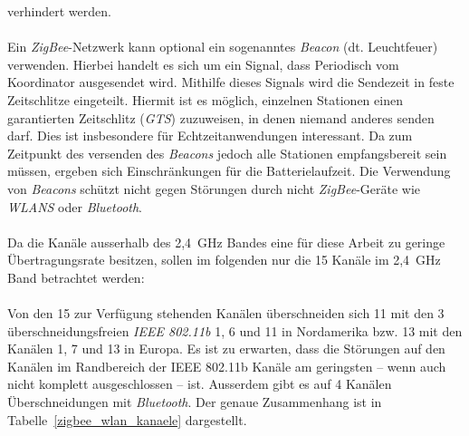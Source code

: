                 verhindert werden.\\
                \\
                Ein \emph{ZigBee}-Netzwerk kann optional ein sogenanntes \emph{Beacon} (dt. Leuchtfeuer) verwenden. Hierbei
                handelt es sich um ein Signal, dass Periodisch vom Koordinator ausgesendet wird. Mithilfe
                dieses Signals wird die Sendezeit in feste Zeitschlitze eingeteilt. Hiermit ist es möglich, 
                einzelnen Stationen einen garantierten Zeitschlitz (\emph{GTS}) zuzuweisen, in denen niemand anderes
                senden darf. Dies ist insbesondere für Echtzeitanwendungen interessant. Da zum Zeitpunkt des
                versenden des \emph{Beacons} jedoch alle Stationen empfangsbereit sein müssen, ergeben sich 
                Einschränkungen für die Batterielaufzeit. Die Verwendung von \emph{Beacons} schützt nicht gegen
                Störungen durch nicht \emph{ZigBee}-Geräte wie \emph{WLANS} oder \emph{Bluetooth}.\\
                \\
                Da die Kanäle ausserhalb des 2,4~GHz Bandes eine für diese Arbeit zu geringe Übertragungsrate
                besitzen, sollen im folgenden nur die 15 Kanäle im 2,4~GHz Band betrachtet werden:\\
                \\
                Von den 15 zur Verfügung stehenden Kanälen überschneiden sich 11 mit den 3 überschneidungsfreien 
                \emph{IEEE 802.11b} 1, 6 und 11 in Nordamerika bzw. 13 mit den Kanälen 1, 7 und 13 in Europa. Es ist zu 
                erwarten, dass die Störungen auf den Kanälen im Randbereich der IEEE 802.11b Kanäle am geringsten --
                wenn auch nicht komplett ausgeschlossen -- ist.
                Ausserdem gibt es auf 4 Kanälen Überschneidungen mit \emph{Bluetooth}. Der genaue Zusammenhang ist
                in Tabelle~\ref{zigbee_wlan_kanaele} dargestellt.

